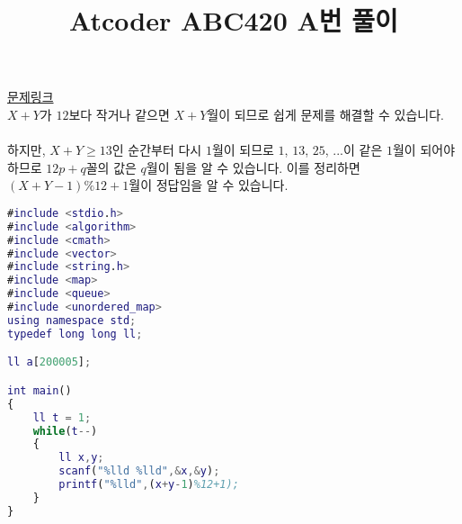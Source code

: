 \documentclass{article}
\title{Atcoder ABC420 A번 풀이}
\begin{document}



\hypersetup{
    colorlinks=true,
    linkcolor=blue,
    filecolor=magenta,      
    urlcolor=cyan,
}

\maketitle

\noindent \href{https://atcoder.jp/contests/abc420/tasks/abc420_a}{문제링크}\\

\noindent $X + Y$가 $12$보다 작거나 같으면 $X + Y$월이 되므로 쉽게 문제를 해결할 수 있습니다.\\\\
하지만, $X + Y \geq 13$인 순간부터 다시 $1$월이 되므로 $1$, $13$, $25$, $...$이 같은 $1$월이 되어야 하므로 $12p + q$꼴의 값은 $q$월이 됨을 알 수 있습니다. 이를 정리하면 $(X + Y - 1) \% 12 + 1$월이 정답임을 알 수 있습니다.\\

\lstset{style=myStyle}
\begin{lstlisting}[caption=소스코드, language=Matlab]
#include <stdio.h>
#include <algorithm>
#include <cmath>
#include <vector>
#include <string.h>
#include <map>
#include <queue>
#include <unordered_map>
using namespace std;
typedef long long ll;

ll a[200005];

int main()
{
    ll t = 1;
    while(t--)
    {
        ll x,y;
        scanf("%lld %lld",&x,&y);
        printf("%lld",(x+y-1)%12+1);
    }
}

\end{lstlisting}
\end{document}
